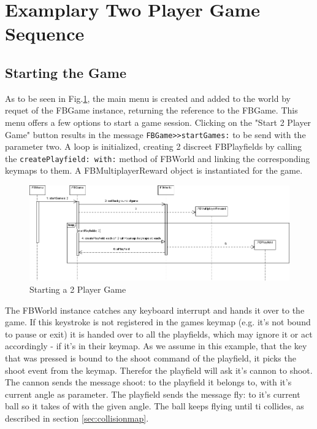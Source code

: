\section{Examplary Two Player Game Sequence}
\subsection{Starting the Game}
As to be seen in Fig.\ref{fig:Starting2PlayerGame}, the main menu is created 
and added to the world by requet of the FBGame instance, returning the reference 
to the FBGame. This menu offers a few options to start a game session. Clicking 
on the "Start 2 Player Game" button results in the message 
\lstinline!FBGame>>startGames:! to be send with the parameter two. A loop is 
initialized, creating 2 discreet FBPlayfields by calling the 
\lstinline!createPlayfield: with:! method of FBWorld and linking the corresponding 
keymaps to them. A FBMultiplayerReward object is instantiated for the game.
%
\begin{figure}[bt]
  \begin{center}
    \includegraphics[width=\linewidth]{images/Starting2PlayerGame.png}
  \end{center}
  \caption{Starting a 2 Player Game}
  \label{fig:Starting2PlayerGame}
\end{figure}
%
The FBWorld instance catches any keyboard interrupt and hands it over to the game. If
this keystroke is not registered in the games keymap (e.g. it's not bound to pause or
exit) it is handed over to all the playfields, which may ignore it or act accordingly -
if it's in their keymap. As we assume in this example, that the key that was pressed is
bound to the shoot command of the playfield, it picks the shoot event from the keymap.
Therefor the playfield will ask it's cannon to shoot. The cannon sends the message shoot:
to the playfield it belongs to, with it's current angle as parameter. The playfield
sends the message fly: to it's current ball so it takes of with the given angle.
The ball keeps flying until ti collides, as described in section \ref{sec:collisionmap}.
